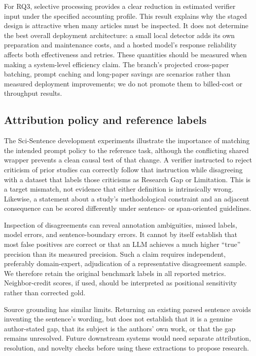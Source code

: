 For RQ3, selective processing provides a clear reduction in estimated verifier input under the
specified accounting profile. This result explains why the staged design is attractive when
many articles must be inspected. It does not determine the best overall deployment architecture:
a small local detector adds its own preparation and maintenance costs, and a hosted model's
response reliability affects both effectiveness and retries. These quantities should be measured
when making a system-level efficiency claim. The branch's projected cross-paper batching, prompt
caching and long-paper savings are scenarios rather than measured deployment improvements;
we do not promote them to billed-cost or throughput results.

\subsection{Attribution policy and reference labels}

The Sci-Sentence development experiments illustrate the importance of matching the intended
prompt policy to the reference task, although the conflicting shared wrapper prevents a clean
causal test of that change. A verifier instructed to reject criticism of prior studies can correctly follow that
instruction while disagreeing with a dataset that labels those criticisms as Research Gap or
Limitation. This is a target mismatch, not evidence that either definition is intrinsically wrong.
Likewise, a statement about a study's methodological constraint and an adjacent consequence can
be scored differently under sentence- or span-oriented guidelines.

Inspection of disagreements can reveal annotation ambiguities, missed labels, model errors,
and sentence-boundary errors. It cannot by itself establish that most false positives are correct
or that an LLM achieves a much higher ``true'' precision than its measured precision. Such a claim
requires independent, preferably domain-expert, adjudication of a representative disagreement
sample. We therefore retain the original benchmark labels in all reported metrics. Neighbor-credit
scores, if used, should be interpreted as positional sensitivity rather than corrected gold.

Source grounding has similar limits. Returning an existing parsed sentence avoids inventing the
sentence's wording, but does not establish that it is a genuine author-stated gap, that its subject
is the authors' own work, or that the gap remains unresolved. Future downstream systems would need
separate attribution, resolution, and novelty checks before using these extractions to propose research.

